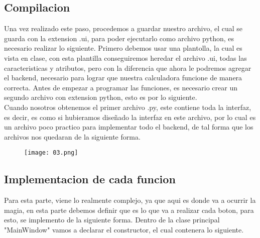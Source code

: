 \documentclass[11pt]{article}
\begin{document}
\subsection{Compilacion}
Una vez realizado este paso, procedemos a guardar nuestro archivo, el cual se guarda con la extension .ui, para poder ejecutarlo como archivo python, es necesario realizar lo siguiente. Primero debemos usar una plantolla, la cual es vista en clase, con esta plantilla conseguiremos heredar el archivo .ui, todas las caracteristicas y atributos, pero con la diferencia que ahora le podremos agregar el backend, necesario para lograr que nuestra calculadora funcione de manera correcta.
Antes de empezar a programar las funciones, es necesario crear un segundo archivo con extension python, esto es por lo siguiente.\\
Cuando nosotros obtenemos el primer archivo .py, este contiene toda la interfaz, es decir, es como si hubieramos diseñado la interfaz en este archivo, por lo cual es un archivo poco practico para implementar todo el backend, de tal forma que los archivos nos quedaran de la siguiente forma.
\begin{figure}[H]
		\begin{center}
 			\texttt{[image: 03.png]}
 			
		\end{center} 
\end{figure}

\subsection{Implementacion de cada funcion}
Para esta parte, viene lo realmente complejo, ya que aqui es donde va a ocurrir la magia, en esta parte debemos definir que es lo que va a realizar cada boton, para esto, se implemento de la siguiente forma. Dentro de la clase principal "MainWindow" vamos a declarar el constructor, el cual contenera lo siguiente. 
\end{document}
